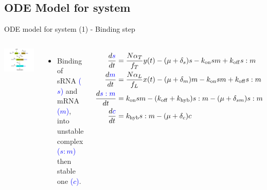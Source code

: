 \documentclass{beamer}
\begin{document}
\subsection{ODE Model for system}
\begin{frame}{ODE model for system (1) - Binding step}{}
\begin{columns}
\includegraphics[trim = 135 0 0 0,clip = true,scale = 0.28]{Figures/schematic_binding}
  \begin{itemize}
    \item  Binding of sRNA \textcolor{blue}{($s$)} and mRNA \textcolor{blue}{($m$)}, into unstable complex \textcolor{blue}{($s:m$)} then stable one \textcolor{blue}{($c$)}.
    \end{itemize}
\footnotesize
\begin{align*} 
\frac{d\textcolor{blue}{s}}{dt} &= \frac{N\alpha_{T}}{f_{T}} y(t)-(\mu + \delta_{s})s -k_{\mathrm{on}}sm +k_{\mathrm{off}}s:m \\
\frac{d\textcolor{blue}{m}}{dt} &=  \frac{N\alpha_{L}}{f_{L}}x(t)-(\mu + \delta_{m})m -k_{\mathrm{on}}sm +k_{\mathrm{off}}s:m  \\
\frac{d\textcolor{blue}{s:m}}{dt} & = k_{\mathrm{on}}sm  - (k_{\mathrm{off}}+ k_{\mathrm{hyb}})s:m  -(\mu + \delta_{sm} )s:m \\
\frac{d\textcolor{blue}{c}}{dt} & = k_{\mathrm{hyb}}s:m  -(\mu + \delta_{c})c  \\
\end{align*}
\end{columns}
\end{frame}
\end{document}
